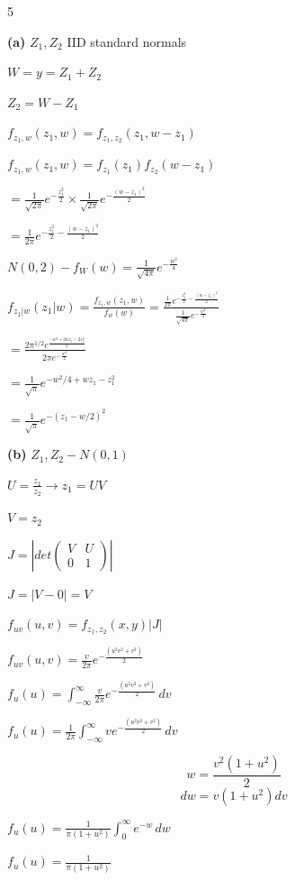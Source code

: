 \documentclass[12 pt]{article}
\begin{document}
    \begin{exercise}{5}
    \hfill

    \textbf{(a)} $Z_1, Z_2$ IID standard normals

    $W = y = Z_1 + Z_2$

    $Z_2 = W - Z_1$

    \hfill

    $f_{z_1, w} (z_1, w) = f_{z_1, z_2}(z_1, w-z_1)$

    $f_{z_1, w}(z_1, w) = f_{z_1}(z_1)f_{z_2}(w-z_1)$

    $ = \frac{1}{\sqrt{2 \pi}}e^{-\frac{z_1^2}{2}} \times \frac{1}{\sqrt{2 \pi}}e^{-\frac{(w - z_1)^2}{2}}$

    $= \frac{1}{2 \pi}e^{-\frac{z_1^2}{2}-\frac{(w-z_1)^2}{2}}$

    \hfill

    $N(0,2) - f_W(w) = \frac{1}{\sqrt{4 \pi}}e^{-\frac{w^2}{4}}$

    \hfill

    $f_{z_1 |w} (z_1|w) = \frac{f_{z_1,w}(z_1, w)}{f_w(w)} = \frac{\frac{1}{2 \pi}e^{-\frac{z_1^2}{2}-\frac{(w-z_1)^2}{2}}}{\frac{1}{\sqrt{4 \pi}}e^{-\frac{w^2}{4}}}$

    $= \frac{2 {\pi}^{1/2}e^{\frac{-w^2+2wz_1-2z_1^2}{2}}}{2 \pi e^{-\frac{w^2}{4}}}$

    $= \frac{1}{\sqrt{\pi}}e^{-w^2/4 + wz_1 - z_1^2}$

    $= \frac{1}{\sqrt{\pi}}e^{-(z_1-w/2)^2}$

    \hfill

    \textbf{(b)} $Z_1, Z_2 - N(0,1)$

    $U= \frac{z_1}{z_2} \xrightarrow{} z_1 = UV$

    $V= z_2$

    \hfill

    $J = |det \begin{pmatrix}
        V & U \\
        0 & 1
    \end{pmatrix}|$

    $J = |V-0| = V$

    \hfill

    $f_{uv}(u,v) = f_{z_1, z_2}(x,y) |J|$

    $f_{uv}(u,v) = \frac{v}{2 \pi} e^{-\frac{(u^2v^2 + v^2)}{2}}$

    \hfill

    $f_u(u) =  \int_{-\infty}^{\infty} \frac{v}{2 \pi} e^{-\frac{(u^2v^2 + v^2)}{2}} \, dv$

    $f_u(u) =  \frac{1}{2 \pi} \int_{-\infty}^{\infty} v e^{-\frac{(u^2v^2 + v^2)}{2}} \, dv$

    $$w = \frac{v^2(1+u^2)}{2}$$
    $$dw = v(1+u^2) dv$$

    $f_u(u) = \frac{1}{\pi (1+u^2)} \int_{0}^{\infty} e^{-w} \, dw$

    $f_u(u) = \frac{1}{\pi (1+u^2)}$

    \hfill
    \end{exercise}
\end{document}
